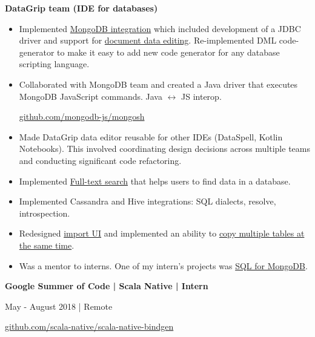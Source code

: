 \documentclass[9pt]{article}
\begin{document}
\begin{multicols}{2}
\vspace{0.8em}
\hspace{2.2em} {\textbf{DataGrip team (IDE for databases)}}
\begin{itemize}
\item Implemented \href{https://www.jetbrains.com/datagrip/whatsnew/2019-3/#version-2019-3-mongodb-support}{MongoDB integration} which included development of a JDBC driver and support for \href{https://www.jetbrains.com/datagrip/whatsnew/2021-1/#version-2021-1-data-editor}{document data editing}. Re-implemented DML code-generator to make it easy to add new code generator for any database scripting language.
\item Collaborated with MongoDB team and created a Java driver that executes MongoDB JavaScript commands. Java \(\leftrightarrow\) JS interop.

\href{https://github.com/mongodb-js/mongosh/tree/main/packages/java-shell}{github.com/mongodb-js/mongosh}
\item Made DataGrip data editor reusable for other IDEs (DataSpell, Kotlin Notebooks). This involved coordinating design decisions across multiple teams and conducting significant code refactoring.
\item Implemented \href{https://www.jetbrains.com/datagrip/whatsnew/2019-2/#version-2019-2-full-text-search}{Full-text search} that helps users to find data in a database.
\item Implemented Cassandra and Hive integrations: SQL dialects, resolve, introspection.
\item Redesigned \href{https://www.jetbrains.com/datagrip/whatsnew/2021-3/#importexport}{import UI} and implemented an ability to \href{https://www.jetbrains.com/datagrip/whatsnew/2022-1/#importexport}{copy multiple tables at the same time}.
\item Was a mentor to interns. One of my intern's projects was \href{https://www.jetbrains.com/datagrip/whatsnew/2020-3/#version-2020-3-sql-for-mongodb}{SQL for MongoDB}.
\end{itemize}

\vspace{1em}

{\textbf{Google Summer of Code | Scala Native | Intern}}

\color{gray} May - August 2018 | Remote \color{black}

\href{https://github.com/scala-native/scala-native-bindgen}{github.com/scala-native/scala-native-bindgen}

\vspace{0.3em}


\end{multicols}
\end{document}
